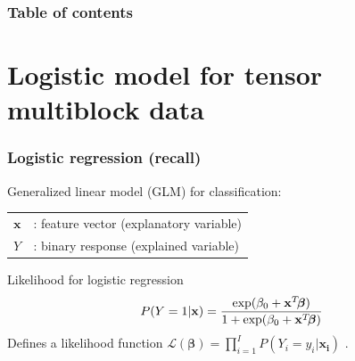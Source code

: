 \documentclass{beamer}
\begin{document}


    


\begin{frame}
    \frametitle{Table of contents}
    \tableofcontents
\end{frame}

\section{Logistic model for tensor multiblock data}
\begin{frame}
\sectionpage
\end{frame}


\begin{frame}
    \frametitle{Logistic regression (recall)}
    Generalized linear model (GLM) for classification:\\[15 pt]
    \begin{tabular}{ll}
        $\mathbf{x}$ & \hspace{-8 pt}: feature vector (explanatory variable)\hspace{5 cm} \\[5 pt]
        $Y$ & \hspace{-8 pt}: binary response (explained variable) \hspace{10 cm}
    \end{tabular}
\vspace{5 pt}
\begin{block}{Likelihood for logistic regression}
$$P(Y = 1|\mathbf{x}) = \frac{\exp(\beta_0 + \mathbf{x}^T\hspace{-2 pt}\bm{\beta})}{1 + \exp(\beta_0 + \mathbf{x}^T\hspace{-2 pt}\bm{\beta})}$$
Defines a likelihood function $\mathcal{L}(\bm{\beta}) = \prod_{i = 1}^I P(Y_i = y_i|\mathbf{x_i})$ .
\end{block}

\end{frame}
\end{document}
